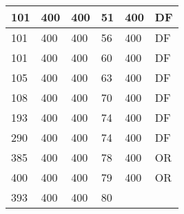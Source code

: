 \begin{table}[]
\begin{tabular}{lllll|l|}
101                                 & 400                                & 400                                & 51                                 & 
400                                & DF                                    \\ \hline
101                                 & 400                                & 400                                & 56                                 & 
400                                & DF                                    \\ \hline
101                                 & 400                                & 400                                & 60                                 & 
400                                & DF                                    \\ \hline
105                                 & 400                                & 400                                & 63                                 & 
400                                & DF                                    \\ \hline
108                                 & 400                                & 400                                & 70                                 & 
400                                & DF                                    \\ \hline
193                                 & 400                                & 400                                & 74                                 & 
400                                & DF                                    \\ \hline
290                                 & 400                                & 400                                & 74                                 & 
400                                & DF                                    \\ \hline
385                                 & 400                                & 400                                & 78                                 & 
400                                & OR                                    \\ \hline
400                                 & 400                                & 400                                & 79                                 & 
400                                & OR                                    \\ \hline
393                                 & 400                                & 400                                & 80                                 & 

\end{tabular}
\end{table}
